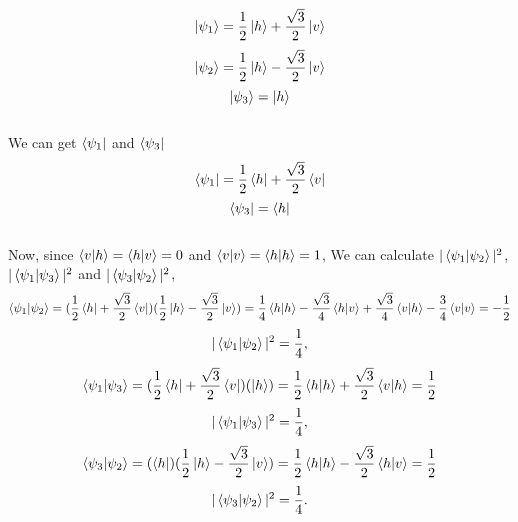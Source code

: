\documentclass[12pt]{article}
\begin{document}
\begin{equation*}
\ket{\psi_1}  = \frac{1}{2}\ket{h} + \frac{\sqrt{3}}{2}\ket{v}
\end{equation*}
\begin{equation*}
\ket{\psi_2}  = \frac{1}{2}\ket{h} - \frac{\sqrt{3}}{2}\ket{v}
\end{equation*}
\begin{equation*}
\ket{\psi_3}  = \ket{h}
\end{equation*}
\\
We can get $\bra{\psi_1}$ and $\bra{\psi_3}$
\begin{equation*}
\bra{\psi_1}  = \frac{1}{2}\bra{h} + \frac{\sqrt{3}}{2}\bra{v}
\end{equation*}
\begin{equation*}
\bra{\psi_3}  = \bra{h}
\end{equation*}
\\
Now, since $\braket{v|h}=\braket{h|v}=0$ and $\braket{v|v}=\braket{h|h}=1$, We can calculate $|\braket{\psi_1|\psi_2}|^{2}$, $|\braket{\psi_1|\psi_3}|^2$ and $|\braket{\psi_3|\psi_2}|^2$,
\begin{equation*}
\braket{\psi_1|\psi_2} = (\frac{1}{2}\bra{h} + \frac{\sqrt{3}}{2}\bra{v})(\frac{1}{2}\ket{h} - \frac{\sqrt{3}}{2}\ket{v})
= \frac{1}{4}\braket{h|h} - \frac{\sqrt{3}}{4}\braket{h|v} + \frac{\sqrt{3}}{4}\braket{v|h} - \frac{3}{4}\braket{v|v}
= -\frac{1}{2}
\end{equation*}
\begin{equation*}
|\braket{\psi_1|\psi_2}|^2 =  \frac{1}{4},
\end{equation*}
\begin{equation*}
\braket{\psi_1|\psi_3} = (\frac{1}{2}\bra{h} + \frac{\sqrt{3}}{2}\bra{v})(\ket{h}) = \frac{1}{2}\braket{h|h} + \frac{\sqrt{3}}{2}\braket{v|h}
= \frac{1}{2}
\end{equation*}
\begin{equation*}
|\braket{\psi_1|\psi_3}|^2 =  \frac{1}{4},
\end{equation*}
\begin{equation*}
\braket{\psi_3|\psi_2} = (\bra{h})(\frac{1}{2}\ket{h} - \frac{\sqrt{3}}{2}\ket{v}) = \frac{1}{2}\braket{h|h} - \frac{\sqrt{3}}{2}\braket{h|v}
= \frac{1}{2}
\end{equation*}
\begin{equation*}
|\braket{\psi_3|\psi_2}|^2 =  \frac{1}{4}.
\end{equation*}
\end{document}

